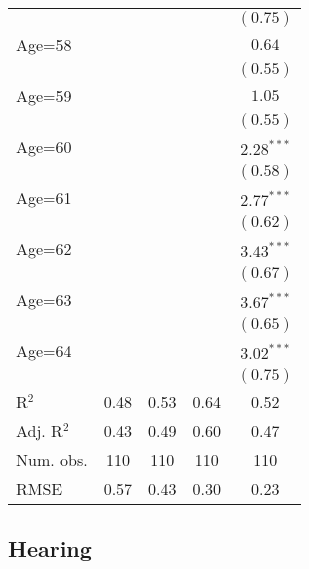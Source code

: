 \documentclass[fullpage]{paper}
\begin{document}
\begin{center}
\begin{longtable}{l c c c c }
            &               &               &               & $(0.75)$      \\
Age=58      &               &               &               & $0.64$        \\
            &               &               &               & $(0.55)$      \\
Age=59      &               &               &               & $1.05$        \\
            &               &               &               & $(0.55)$      \\
Age=60      &               &               &               & $2.28^{***}$  \\
            &               &               &               & $(0.58)$      \\
Age=61      &               &               &               & $2.77^{***}$  \\
            &               &               &               & $(0.62)$      \\
Age=62      &               &               &               & $3.43^{***}$  \\
            &               &               &               & $(0.67)$      \\
Age=63      &               &               &               & $3.67^{***}$  \\
            &               &               &               & $(0.65)$      \\
Age=64      &               &               &               & $3.02^{***}$  \\
            &               &               &               & $(0.75)$      \\
\hline
R$^2$       & 0.48          & 0.53          & 0.64          & 0.52          \\
Adj. R$^2$  & 0.43          & 0.49          & 0.60          & 0.47          \\
Num. obs.   & 110           & 110           & 110           & 110           \\
RMSE        & 0.57          & 0.43          & 0.30          & 0.23          \\
\end{longtable}
\end{center}
\subsection{ Hearing }
\end{document}
